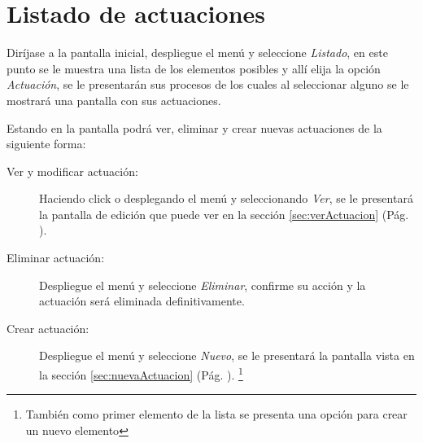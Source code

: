 \section{Listado de actuaciones}
\label{sec:listadoActuaciones}
Dir\'ijase a la pantalla inicial, despliegue el men\'u \blackberry y seleccione
\emph{Listado}, en este punto se le muestra una lista de los elementos posibles
y all\'i elija la opci\'on \emph{Actuaci\'on}, se le presentar\'an sus procesos
de los cuales al seleccionar alguno se le mostrar\'a una pantalla
con sus actuaciones.

Estando en la pantalla podr\'a ver, eliminar y crear nuevas
actuaciones de la siguiente forma:

\begin{description}
\item[Ver y modificar actuaci\'on:]Haciendo click o desplegando el men\'u
\blackberry y seleccionando \emph{Ver}, se le presentar\'a la pantalla de
edici\'on que puede ver en la secci\'on \ref{sec:verActuacion} (P\'ag.
\pageref{sec:verActuacion}).
\item[Eliminar actuaci\'on:]Despliegue el men\'u \blackberry y seleccione
\emph{Eliminar}, confirme su acci\'on y la actuaci\'on ser\'a eliminada
definitivamente.
\item[Crear actuaci\'on:]Despliegue el men\'u \blackberry y seleccione \emph{Nuevo},
se le presentar\'a la pantalla vista en la secci\'on \ref{sec:nuevaActuacion}
(P\'ag. \pageref{sec:nuevaActuacion}).
\footnote{Tambi\'en como primer elemento de la lista se presenta una opci\'on
para crear un nuevo elemento}
\end{description}

